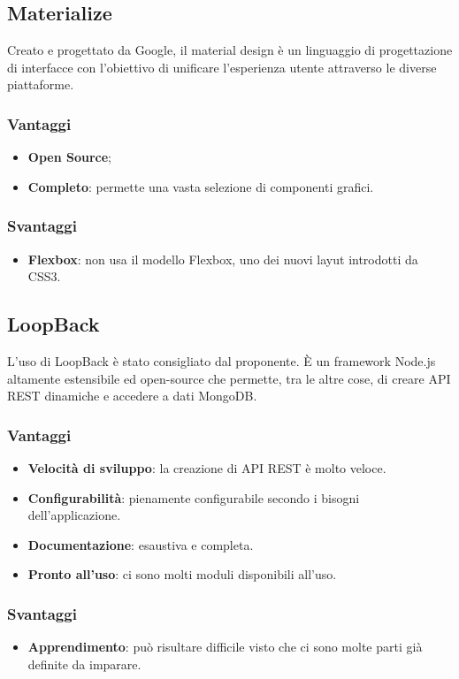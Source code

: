 \subsection{Materialize}
Creato e progettato da Google, il material design è un linguaggio di progettazione di interfacce con l'obiettivo di unificare l'esperienza utente attraverso le diverse piattaforme.
\subsubsection{Vantaggi}
\begin{itemize}
\item \textbf{Open Source};
\item \textbf{Completo}: permette una vasta selezione di componenti grafici.
\end{itemize}
\subsubsection{Svantaggi}
\begin{itemize}
\item \textbf{Flexbox}: non usa il modello Flexbox, uno dei nuovi layut introdotti da CSS3.
\end{itemize}
\subsection{LoopBack}
L'uso di LoopBack \`e stato consigliato dal proponente. \`E un framework Node.js altamente estensibile ed open-source che permette, tra le altre cose, di creare API REST dinamiche e accedere a dati MongoDB.
\subsubsection{Vantaggi}
\begin{itemize}
\item \textbf{Velocit\`a di sviluppo}: la creazione di API REST \`e molto veloce.
\item \textbf{Configurabilit\`a}: pienamente configurabile secondo i bisogni dell'applicazione.
\item \textbf{Documentazione}: esaustiva e completa.
\item \textbf{Pronto all'uso}: ci sono molti moduli disponibili all'uso.
\end{itemize}
\subsubsection{Svantaggi}
\begin{itemize}
\item \textbf{Apprendimento}: pu\`o risultare difficile visto che ci sono molte parti gi\`a definite da imparare.
\end{itemize}
